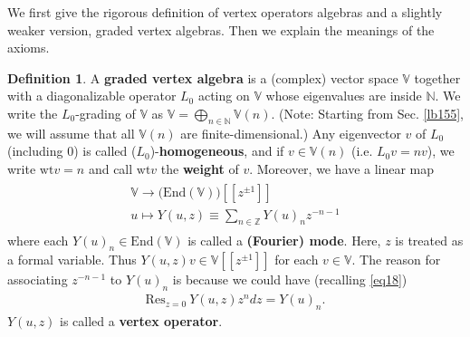 \documentclass[11pt,b5paper,notitlepage]{article}
\theoremstyle{definition}
\newtheorem{df}{Definition}[section]
\theoremstyle{plain}
\newcommand{\wtd}{\widetilde}
\newcommand{\End}{\mathrm{End}} %
\newcommand{\Res}{\mathrm{Res}}
\newcommand{\Vbb}{\mathbb V}
\newcommand{\Nbb}{\mathbb N}
\newcommand{\Zbb}{\mathbb Z}
\newcommand{\wt}{\mathrm{wt}}
\numberwithin{equation}{section}
\begin{document}
We first give the rigorous definition of vertex operators algebras and a slightly weaker version, graded vertex algebras. Then we explain the meanings of the axioms.



\begin{df}\label{lb24}
A \textbf{graded vertex algebra} is a (complex) vector space $\Vbb$ together with a diagonalizable operator $L_0$ acting on $\Vbb$ whose eigenvalues are inside $\Nbb$. We write the $L_0$-grading of $\Vbb$ as $\Vbb=\bigoplus_{n\in\Nbb}\Vbb(n)$. (Note: Starting from Sec. \ref{lb155}, we will assume that all $\Vbb(n)$ are finite-dimensional.) Any eigenvector $v$ of $L_0$ (including $0$) is called ($L_0$)-\textbf{homogeneous}, and if $v\in \Vbb(n)$ (i.e. $L_0v=nv$), we write $\wt v=n$ \index{vw@$\wt v,\wtd\wt w$} and call $\wt v$ the \textbf{weight} of $v$. Moreover, we have a linear map
\begin{gather}
\begin{gathered}
\Vbb\rightarrow\big(\End(\Vbb)\big)[[z^{\pm1}]]\\
u\mapsto Y(u,z)\equiv\sum_{n\in\Zbb}Y(u)_nz^{-n-1}
\end{gathered}	
\end{gather}
where each $Y(u)_n\in\End(\Vbb)$ is called a \textbf{(Fourier) mode}. Here, $z$ is treated as a formal variable. Thus $Y(u,z)v\in\Vbb[[z^{\pm1}]]$ for each $v\in\Vbb$. The reason for associating $z^{-n-1}$ to $Y(u)_n$ is because we could have (recalling \eqref{eq18})
\begin{align}
\Res_{z=0}~Y(u,z)z^ndz=Y(u)_n.	
\end{align}
$Y(u,z)$ is called a \textbf{vertex operator}. 


\end{df}
\end{document}
